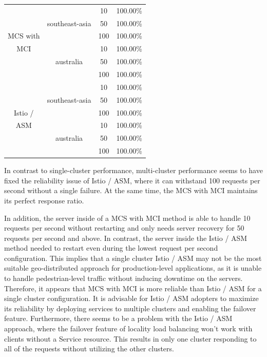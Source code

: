\begin{table}[h]
\begin{tabular}{|c|c|c|c|}

 & & 10 & 100.00\% \\ \cline{3-4}
 & southeast-asia & 50 & 100.00\% \\ \cline{3-4}
MCS with & & 100 & 100.00\% \\ \cline{2-4}
MCI & & 10 & 100.00\% \\ \cline{3-4}
 & australia & 50 & 100.00\% \\ \cline{3-4}
 & & 100 & 100.00\% \\ \hline
 & & 10 & 100.00\% \\ \cline{3-4}
 & southeast-asia & 50 & 100.00\% \\ \cline{3-4}
Istio / & & 100 & 100.00\% \\ \cline{2-4}
ASM & & 10 & 100.00\% \\ \cline{3-4}
 & australia & 50 & 100.00\% \\ \cline{3-4}
 & & 100 & 100.00\% \\ \hline

\end{tabular}
\label{tab:reliability-multi-cluster-results}
\end{table}

In contrast to single-cluster performance, multi-cluster performance seems to have fixed the reliability issue of Istio / ASM, where it can withstand 100 requests per second without a single failure. At the same time, the MCS with MCI maintains its perfect response ratio.

In addition, the server inside of a MCS with MCI method is able to handle 10 requests per second without restarting and only needs server recovery for 50 requests per second and above. In contrast, the server inside the Istio / ASM method needed to restart even during the lowest request per second configuration. This implies that a single cluster Istio / ASM may not be the most suitable geo-distributed approach for production-level applications, as it is unable to handle pedestrian-level traffic without inducing downtime on the servers. Therefore, it appears that MCS with MCI is more reliable than Istio / ASM for a single cluster configuration. It is advisable for Istio / ASM adopters to maximize its reliability by deploying services to multiple clusters and enabling the failover feature. Furthermore, there seems to be a problem with the Istio / ASM approach, where the failover feature of locality load balancing won't work with clients without a Service resource. This results in only one cluster responding to all of the requests without utilizing the other clusters.

